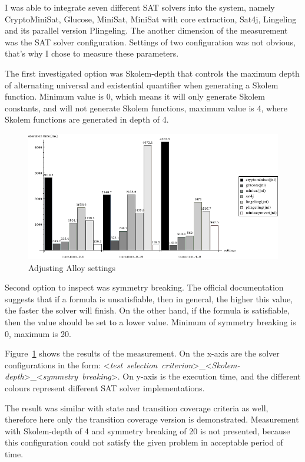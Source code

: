 I was able to integrate seven different SAT solvers into the system, namely CryptoMiniSat, Glucose, MiniSat, MiniSat with core extraction, Sat4j, Lingeling and its parallel version Plingeling. The another dimension of the measurement was the SAT solver configuration. Settings of two configuration was not obvious, that's why I chose to measure these parameters.

The first investigated option was Skolem-depth that controls the maximum depth of alternating universal and existential quantifier when generating a Skolem function. Minimum value is 0, which means it will only generate Skolem constants, and will not generate Skolem functions, maximum value is 4, where Skolem functions are generated in depth of 4.

\begin{figure}[htp]
\centering
\includegraphics[scale=0.55]{figures/measurements_alloy_settings}
\caption{Adjusting Alloy settings}
\label{fig:measurements_alloy_settings}
\end{figure}

Second option to inspect was symmetry breaking. The official documentation suggests that  if a formula is unsatisfiable, then in general, the higher this value, the faster the solver will finish. On the other hand, if the formula is satisfiable, then the value should be set to a lower value. Minimum of symmetry breaking is 0, maximum is 20.

Figure~\ref{fig:measurements_alloy_settings} shows the results of the measurement. On the x-axis are the solver configurations in the form: \mbox{<\textit{test selection criterion}>\_<\textit{Skolem-depth}>\_<\textit{symmetry breaking}>}. On y-axis is the execution time, and the different colours represent different SAT solver implementations.

The result was similar with state and transition coverage criteria as well, therefore here only the transition coverage version is demonstrated. Measurement with Skolem-depth of 4 and symmetry breaking of 20 is not presented, because this configuration could not satisfy the given problem in acceptable period of time.

